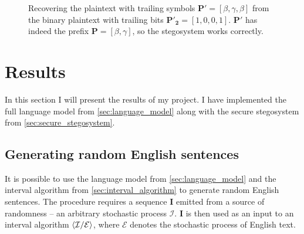 \documentclass[draft]{IIBproject}
\makeatletter
\DeclarePairedDelimiter{\angled}{\langle}{\rangle}
\DeclareRobustCommand{\intervalAlgorithm}[2]{$\angled{\mathcal{#1} / \mathcal{#2}}$\@\xspace}
\newcommand{\interval}[6] {
	\draw[#6] [i] (#1,#2+#4*#3) -- (#1,#2+#5*#3);
}
\newcommand{\intervalTopLabel}[7] {
	\interval{#1}{#2}{#3}{#4}{#5}{#6}
	\node[#7] at (#1,#2+#5*#3) {\footnotesize #5};
}
\newcommand{\intervalBottomLabel}[7] {
	\interval{#1}{#2}{#3}{#4}{#5}{#6}
	\node[#7] at (#1,#2+#4*#3) {\footnotesize #4};
}
\newcommand{\intervalBothLabels}[7] {
	\intervalBottomLabel{#1}{#2}{#3}{#4}{#5}{#6}{#7}
	\node[#7] at (#1,#2+#5*#3) {\footnotesize #5};
}
\makeatother
\begin{document}
\begin{figure}[h]

	\caption{\label{fig:binary_to_plaintext}Recovering the plaintext with trailing symbols $\mathbf{P'} = [\beta,\gamma,\beta]$ from the binary plaintext with trailing bits $\mathbf{P'_2} = [1,0,0,1]$. $\mathbf {P'}$ has indeed the prefix $\mathbf P = [\beta,\gamma]$, so the stegosystem works correctly.}

\end{figure}

\clearpage
\section{Results}

In this section I will present the results of my project. I have implemented the full language model from \cref{sec:language_model} along with the secure stegosystem from \cref{sec:secure_stegosystem}.

\subsection{Generating random English sentences}

It is possible to use the language model from \cref{sec:language_model} and the interval algorithm from \cref{sec:interval_algorithm} to generate random English sentences. The procedure requires a sequence $\mathbf I$ emitted from a source of randomness -- an arbitrary stochastic process $\mathcal I$. $\mathbf I$ is then used as an input to an interval algorithm \intervalAlgorithm{I}{E}, where $\mathcal E$ denotes the stochastic process of English text.
\end{document}
